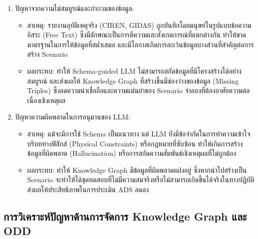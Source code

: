 \begin{enumerate}
    \item ปัญหาจากความไม่สมบูรณ์และกำกวมของข้อมูล:
    \begin{itemize}
        \item สาเหตุ: รายงานอุบัติเหตุจริง (CIREN, GIDAS) ถูกบันทึกโดยมนุษย์ในรูปแบบข้อความอิสระ (Free Text) ซึ่งมีลักษณะเป็นการตีความและสังเกตการณ์ที่แตกต่างกัน ทำให้ขาดมาตรฐานในการให้ข้อมูลที่สม่ำเสมอ และมีโอกาสเกิดการละเว้นข้อมูลบางส่วนที่สำคัญต่อการสร้าง Scenario
        \item ผลกระทบ: ทำให้ Schema-guided LLM ไม่สามารถสกัดข้อมูลที่มีโครงสร้างได้อย่างสมบูรณ์ และส่งผลให้ Knowledge Graph ที่สร้างขึ้นมีช่องว่างของข้อมูล (Missing Triples) ซึ่งลดความน่าเชื่อถือและความแม่นยำของ Scenario จำลองที่ต้องอาศัยความต่อเนื่องเชิงเหตุผล
    \end{itemize}
    \item ปัญหาความผิดพลาดในการอนุมานของ LLM:
    \begin{itemize}
        \item สาเหตุ: แม้จะมีการใช้ Schema เป็นแนวทาง แต่ LLM ยังมีข้อจำกัดในการทำความเข้าใจบริบททางฟิสิกส์ (Physical Constraints) หรือกฎหมายที่ซับซ้อน ทำให้เกิดการสร้างข้อมูลที่ผิดพลาด (Hallucination) หรือการสกัดความสัมพันธ์เชิงเหตุผลที่ไม่ถูกต้อง
        \item ผลกระทบ: ทำให้ Knowledge Graph มีข้อมูลที่ผิดพลาดแฝงอยู่ ซึ่งหากนำไปสร้างเป็น Scenario จะทำให้ได้ชุดทดสอบที่ไม่มีความสมจริงหรือไม่สามารถเกิดขึ้นได้จริงในทางปฏิบัติ ส่งผลให้ประสิทธิภาพในการประเมิน ADS ลดลง
    \end{itemize}
\end{enumerate}

\subsection{การวิเคราะห์ปัญหาด้านการจัดการ Knowledge Graph และ ODD}\label{subsec:kg-odd-management-analysis}


